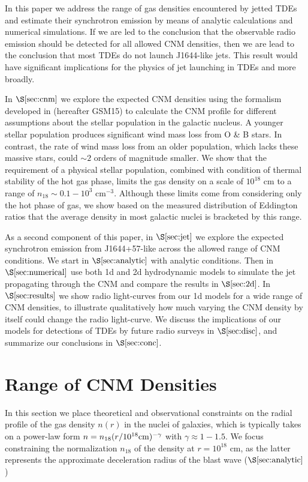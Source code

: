 \documentclass[usenatbib,fleqn]{mnras}
\begin{document}
In this paper we address the range of gas densities encountered by
jetted TDEs and estimate their synchrotron emission by means of
analytic calculations and numerical simulations.  If we are led to the
conclusion that the observable radio emission should be detected for
all allowed CNM densities, then we are lead to the conclusion that
most TDEs do not launch J1644-like jets.  This result would have
significant implications for the physics of jet launching in TDEs and
more broadly.

In $\S\ref{sec:cnm}$ we explore the expected CNM densities using the
formalism developed in \citet{Generozov+2015} (hereafter GSM15) to
calculate the CNM profile for different assumptions about the stellar
population in the galactic nucleus.  A younger stellar population
produces significant wind mass loss from O \& B stars. In contrast,
the rate of wind mass loss from an older population, which lacks these
massive stars, could $\sim 2$ orders of magnitude smaller.  We show
that the requirement of a physical stellar population, combined with
condition of thermal stability of the hot gas phase, limits the gas
density on a scale of $10^{18}$ cm to a range of $n_{18} \sim
0.1-10^{3}$ cm$^{-3}$.  Although these limits come from considering
only the hot phase of gas, we show based on the measured distribution
of Eddington ratios that the average density in most galactic nuclei
is bracketed by this range. 

As a second component of this paper, in $\S\ref{sec:jet}$ we
explore the expected synchrotron emission from J1644+57-like across
the allowed range of CNM conditions.  We start in
$\S\ref{sec:analytic}$ with analytic conditions.  Then in
$\S\ref{sec:numerical}$ use both 1d and 2d hydrodynamic models to
simulate the jet propagating through the CNM and compare the results
in $\S\ref{sec:2d}$. In $\S\ref{sec:results}$ we show radio
light-curves from our 1d models for a wide range of CNM densities, to
illustrate qualitatively how much varying the CNM density by itself
could change the radio light-curve.  We discuss the implications of
our models for detections of TDEs by future radio surveys in
$\S\ref{sec:disc}$, and summarize our conclusions in
$\S\ref{sec:conc}$.

\section{Range of CNM Densities}
\label{sec:cnm}

In this section we place theoretical and observational constraints on
the radial profile of the gas density $n(r)$ in the nuclei of
galaxies, which is typically takes on a power-law form $n =
n_{18}(r/10^{18}{\rm cm})^{-\gamma}$ with $\gamma \approx 1-1.5$.  We
focus constraining the normalization $n_{18}$ of the density at $r =
10^{18}$ cm, as the latter represents the approximate deceleration
radius of the blast wave ($\S\ref{sec:analytic}$)
\end{document}
